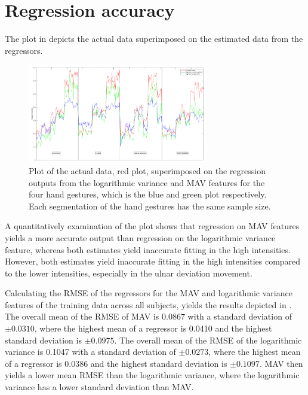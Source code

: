 \section{Regression accuracy}
The plot in  depicts the actual data superimposed on the estimated data from the regressors. 

\begin{figure}[H]
	\includegraphics[width=0.7\textwidth]{figures/results/regressionOutputVsInput}  %
	\caption{Plot of the actual data, red plot, superimposed on the regression outputs from the logarithmic variance and MAV features for the four hand gestures, which is the blue and green plot respectively. Each segmentation of the hand gestures has the same sample size.}
	\label{fig:regressionOutputVsInput}  %
\end{figure}

A quantitatively examination of the plot shows that regression on MAV features yields a more accurate output than regression on the logarithmic variance feature, whereas both estimates yield inaccurate fitting in the high intensities. However, both estimates yield inaccurate fitting in the high intensities compared to the lower intensities, especially in the ulnar deviation movement.
  


Calculating the RMSE of the regressors for the MAV and logarithmic variance features of the training data across all subjects, yields the results depicted in . The overall mean of the RMSE of MAV is 0.0867 with a standard deviation of $\pm 0.0310$, where the highest mean of a regressor is 0.0410 and the highest standard deviation is $\pm 0.0975$. The overall mean of the RMSE of the logarithmic variance is 0.1047 with a standard deviation of $\pm 0.0273$, where the highest mean of a regressor is 0.0386 and the highest standard deviation is $\pm 0.1097$. MAV then yields a lower mean RMSE than the logarithmic variance, where the logarithmic variance has a lower standard deviation than MAV. 


